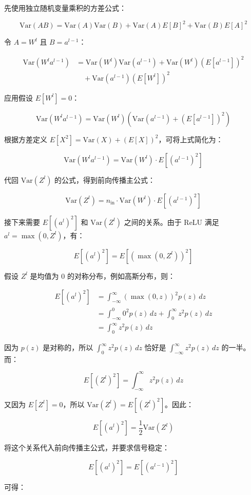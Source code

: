 先使用独立随机变量乘积的方差公式：

\[
\mathrm{Var}(AB)
=\mathrm{Var}(A)\mathrm{Var}(B)
+\mathrm{Var}(A)E[B]^2
+\mathrm{Var}(B)E[A]^2
\]

令 \(A=W^l\) 且 \(B=a^{l-1}\)：

\[
\begin{aligned}
\mathrm{Var}(W^la^{l-1})
&=\mathrm{Var}(W^l)\mathrm{Var}(a^{l-1})
+\mathrm{Var}(W^l)(E[a^{l-1}])^2\\
&\quad+\mathrm{Var}(a^{l-1})(E[W^l])^2
\end{aligned}
\]

应用假设 \(E[W^l]=0\)：

\[
\mathrm{Var}(W^la^{l-1})
=\mathrm{Var}(W^l)\left(\mathrm{Var}(a^{l-1})+(E[a^{l-1}])^2\right)
\]

根据方差定义 \(E[X^2]=\mathrm{Var}(X)+(E[X])^2\)，可将上式简化为：

\[
\mathrm{Var}(W^la^{l-1})
=\mathrm{Var}(W^l)\cdot E[(a^{l-1})^2]
\]

代回 \(\mathrm{Var}(Z^l)\) 的公式，得到前向传播主公式：

\[
\mathrm{Var}(Z^l)=n_{\mathrm{in}}\cdot \mathrm{Var}(W^l)\cdot E[(a^{l-1})^2]
\]

接下来需要 \(E[(a^l)^2]\) 和 \(\mathrm{Var}(Z^l)\) 之间的关系。由于 ReLU 满足 \(a^l=\max(0,Z^l)\)，有：

\[
E[(a^l)^2]=E[(\max(0,Z^l))^2]
\]

假设 \(Z^l\) 是均值为 0 的对称分布，例如高斯分布，则：

\[
\begin{aligned}
E[(a^l)^2]
&=\int_{-\infty}^{\infty}(\max(0,z))^2p(z)\,dz\\
&=\int_{-\infty}^{0}0^2p(z)\,dz+\int_{0}^{\infty}z^2p(z)\,dz\\
&=\int_{0}^{\infty}z^2p(z)\,dz
\end{aligned}
\]

因为 \(p(z)\) 是对称的，所以 \(\int_0^\infty z^2p(z)\,dz\) 恰好是 \(\int_{-\infty}^{\infty}z^2p(z)\,dz\) 的一半。而：

\[
E[(Z^l)^2]=\int_{-\infty}^{\infty}z^2p(z)\,dz
\]

又因为 \(E[Z^l]=0\)，所以 \(\mathrm{Var}(Z^l)=E[(Z^l)^2]\)。因此：

\[
E[(a^l)^2]=\frac{1}{2}\mathrm{Var}(Z^l)
\]

将这个关系代入前向传播主公式，并要求信号稳定：

\[
E[(a^l)^2]=E[(a^{l-1})^2]
\]

可得：

